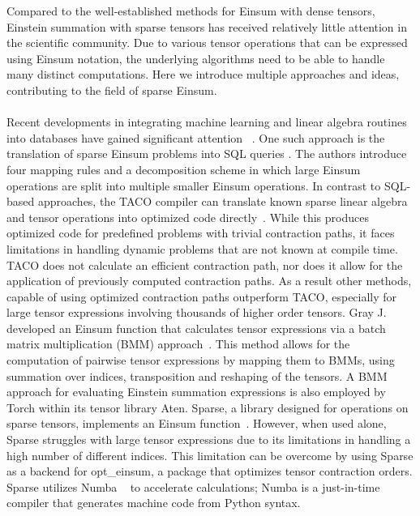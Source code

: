 
\noindent
Compared to the well-established methods for Einsum with dense tensors, Einstein summation with
sparse tensors has received relatively little attention in the scientific community.
Due to various tensor operations that can be expressed using Einsum notation, the
underlying algorithms need to be able to handle many distinct computations. Here we
introduce multiple approaches and ideas, contributing to the field of sparse Einsum.
\\
\\
Recent developments in integrating machine learning and linear algebra routines into
databases have gained significant attention
~\cite{Machine_Learning_LinA_and_More, du2020inmachinelearningdatabasereimaginingdeep,
       data_management_in_machine_learning, deepdive}.
One such approach is the translation of sparse Einsum problems into SQL queries
\cite{sql_einsum}. The authors introduce four mapping rules and a decomposition scheme
in which large Einsum operations are split into multiple smaller Einsum operations.
In contrast to SQL-based approaches, the TACO compiler can translate known sparse linear
algebra and tensor operations into optimized code directly~\cite{taco}. While this produces
optimized code for predefined problems with trivial contraction paths, it faces limitations
in handling dynamic problems that are not known at compile time. TACO does not calculate
an efficient contraction path, nor does it allow for the application of previously computed
contraction paths. As a result other methods, capable of using optimized contraction paths
outperform TACO, especially for large tensor expressions involving thousands of higher order tensors.
Gray J. developed an Einsum function that calculates tensor expressions via a batch matrix
multiplication (BMM) approach~\cite{jcmgray}. This method allows for the computation of pairwise
tensor expressions by mapping them to BMMs, using summation over indices, transposition
and reshaping of the tensors. A BMM approach for evaluating Einstein summation expressions
is also employed by Torch within its tensor library Aten. Sparse, a library designed for
operations on sparse tensors, implements an Einsum function~\cite{sparse}. However, when used
alone, Sparse struggles with large tensor expressions due to its limitations in handling a high
number of different indices. This limitation can be overcome by using Sparse as a backend for
opt\_einsum, a package that optimizes tensor contraction orders. Sparse utilizes Numba
~\cite{lam2015numba} to accelerate calculations; Numba is a just-in-time compiler that generates
machine code from Python syntax.